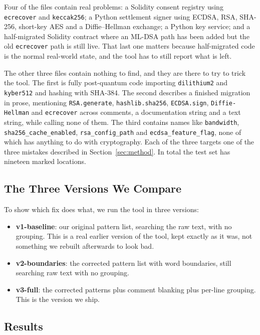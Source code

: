 \documentclass[runningheads]{llncs}
\begin{document}
Four of the files contain real problems: a Solidity consent registry using
\texttt{ecrecover} and \texttt{keccak256}; a Python settlement signer using
ECDSA, RSA, SHA-256, short-key AES and a Diffie--Hellman exchange; a Python key
service; and a half-migrated Solidity contract where an ML-DSA path has been
added but the old \texttt{ecrecover} path is still live. That last one matters
because half-migrated code is the normal real-world state, and the tool has to
still report what is left.

The other three files contain nothing to find, and they are there to try to
trick the tool. The first is fully post-quantum code importing
\texttt{dilithium2} and \texttt{kyber512} and hashing with SHA-384. The second
describes a finished migration in prose, mentioning \texttt{RSA.generate},
\texttt{hashlib.sha256}, \texttt{ECDSA.sign}, \texttt{Diffie-Hellman} and
\texttt{ecrecover} across comments, a documentation string and a text string,
while calling none of them. The third contains names like \texttt{bandwidth},
\texttt{sha256\_cache\_enabled}, \texttt{rsa\_config\_path} and
\texttt{ecdsa\_feature\_flag}, none of which has anything to do with
cryptography. Each of the three targets one of the three mistakes described in
Section~\ref{sec:method}. In total the test set has nineteen marked locations.

\subsection{The Three Versions We Compare}

To show which fix does what, we run the tool in three versions:

\begin{itemize}
  \item \textbf{v1-baseline}: our original pattern list, searching the raw text,
  with no grouping. This is a real earlier version of the tool, kept exactly as
  it was, not something we rebuilt afterwards to look bad.
  \item \textbf{v2-boundaries}: the corrected pattern list with word boundaries,
  still searching raw text with no grouping.
  \item \textbf{v3-full}: the corrected patterns plus comment blanking plus
  per-line grouping. This is the version we ship.
\end{itemize}

\subsection{Results}
\label{sec:results}
\end{document}
